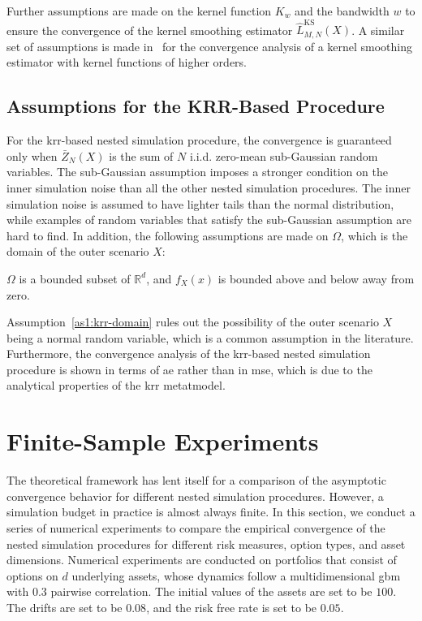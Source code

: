 Further assumptions are made on the kernel function $K_w$ and the bandwidth $w$ to ensure the convergence of the kernel smoothing estimator $\hat{L}^{\text{KS}}_{M, N}(X)$.
A similar set of assumptions is made in~\cite{jennen1988unifying} for the convergence analysis of a kernel smoothing estimator with kernel functions of higher orders.

\subsection{Assumptions for the KRR-Based Procedure}
For the \gls{krr}-based nested simulation procedure, the convergence is guaranteed only when $\bar{Z}_N(X)$ is the sum of $N$ i.i.d. zero-mean sub-Gaussian random variables.
The sub-Gaussian assumption imposes a stronger condition on the inner simulation noise than all the other nested simulation procedures.
The inner simulation noise is assumed to have lighter tails than the normal distribution, while examples of random variables that satisfy the sub-Gaussian assumption are hard to find.
In addition, the following assumptions are made on $\Omega$, which is the domain of the outer scenario $X$:

\begin{assumption}\label{as1:krr-domain}
    $\Omega$ is a bounded subset of $\mathbb{R}^d$, and $f_X(x)$ is bounded above and below away from zero.
\end{assumption}

Assumption~\ref{as1:krr-domain} rules out the possibility of the outer scenario $X$ being a normal random variable, which is a common assumption in the literature.
Furthermore, the convergence analysis of the \gls{krr}-based nested simulation procedure is shown in terms of \gls{ae} rather than in \gls{mse}, which is due to the analytical properties of the \gls{krr} metatmodel.

\section{Finite-Sample Experiments}\label{sec1:numerical-experiments}
The theoretical framework has lent itself for a comparison of the asymptotic convergence behavior for different nested simulation procedures.
However, a simulation budget in practice is almost always finite.
In this section, we conduct a series of numerical experiments to compare the empirical convergence of the nested simulation procedures for different risk measures, option types, and asset dimensions.
Numerical experiments are conducted on portfolios that consist of options on $d$ underlying assets, whose dynamics follow a multidimensional \gls{gbm} with $0.3$ pairwise correlation.
The initial values of the assets are set to be $100$.
The drifts are set to be $0.08$, and the risk free rate is set to be $0.05$.

